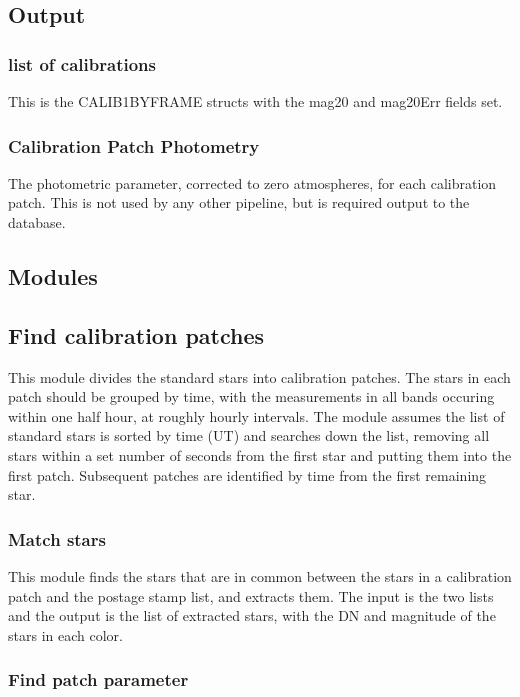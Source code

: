 \subsection{Output}

\subsubsection{list of calibrations}
This is the CALIB1BYFRAME structs with the mag20 and mag20Err fields set.

\subsubsection{Calibration Patch Photometry}
The photometric parameter, corrected to zero atmospheres, for each
calibration patch.  This is not used by any other pipeline, but is required
output to the database.

\subsection{Modules}

\subsection{Find calibration patches}

This module divides the standard stars into calibration patches. The
stars in each patch should be grouped by time, with the measurements
in all bands occuring within one half hour, at roughly hourly
intervals. The module assumes the list of standard stars is sorted by
time (UT) and searches down the list, removing all stars within a set
number of seconds from the first star and putting them into the first
patch. Subsequent patches are identified by time from the first
remaining star. 

\subsubsection{Match stars}

This module finds the stars that are in common between the stars in a 
calibration patch and the postage stamp list, and extracts them.  The input 
is the two lists and the output is the list of extracted stars, with the DN
and magnitude of the stars in each color.

\subsubsection{Find patch parameter}

